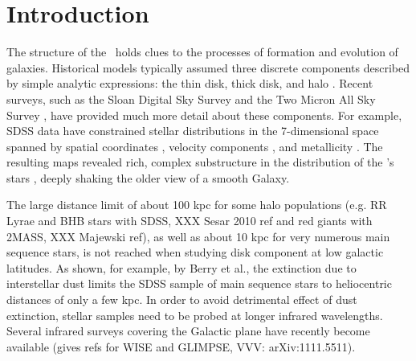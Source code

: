 \section{Introduction}

The structure of the \mw\ holds clues to the processes of formation and evolution of galaxies.
Historical models typically assumed three discrete components described by simple analytic 
expressions: the thin disk, thick disk, and halo \citep{1980ApJS...44...73B, 1989ARA&A..27..555G,1993ARA&A..31..575M}. 
Recent surveys, such as the Sloan Digital Sky Survey \citep[\sdss, ][]{2000AJ....120.1579Y} 
and the Two Micron All Sky Survey \citep[\twomass, ][]{2006AJ....131.1163S}, have provided 
much more detail about these components. For example, SDSS data have constrained stellar distributions 
in the 7-dimensional space spanned by spatial coordinates \citep{2008ApJ...673..864J}, velocity components \citep{2010ApJ...716....1B}, and metallicity \citep{2008ApJ...684..287I}. The resulting maps revealed rich, complex substructure in the distribution of the \mw's stars \citep[e.g.][]{2000AJ....120..963I,2000ApJ...540..825Y,2001ApJ...554L..33V,2002ApJ...569..245N,2003ApJ...599.1082M,2006ApJ...642L.137B,2006ApJ...651L..29G,2006AJ....132..714V}, deeply shaking the older view of a smooth Galaxy. 


The large distance limit of about 100 kpc for some halo populations (e.g. RR Lyrae and BHB stars 
with SDSS, XXX Sesar 2010 ref and red giants with 2MASS, XXX Majewski ref), as well as about 10 kpc 
for very numerous main sequence stars, is not reached when studying disk component at low galactic
latitudes. As shown, for example, by Berry et al., the extinction due to interstellar dust limits 
the SDSS sample of main sequence stars to heliocentric distances of only a few kpc. In order
to avoid detrimental effect of dust extinction, stellar samples need to be probed at longer infrared
wavelengths. Several infrared surveys covering the Galactic plane have recently become available
(gives refs for WISE and GLIMPSE, VVV: arXiv:1111.5511). 

